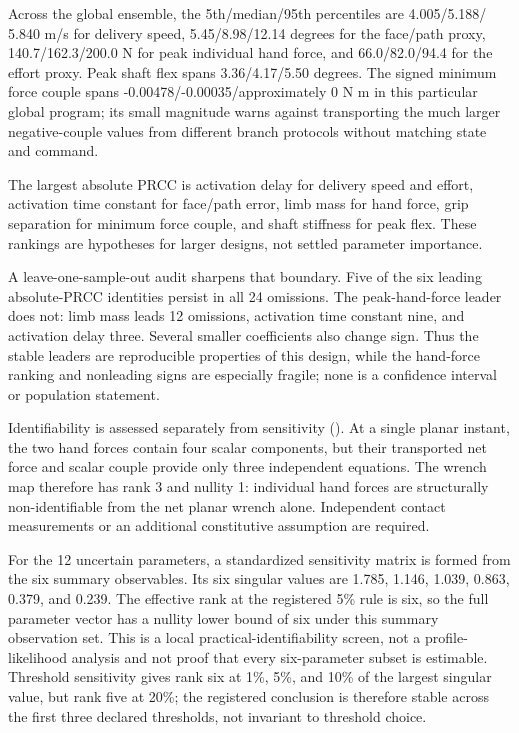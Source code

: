 \documentclass[
  letterpaper,
]{report}
\begin{document}
Across the global ensemble, the 5th/median/95th percentiles are
4.005/5.188/ 5.840 m/s for delivery speed, 5.45/8.98/12.14 degrees for
the face/path proxy, 140.7/162.3/200.0 N for peak individual hand force,
and 66.0/82.0/94.4 for the effort proxy. Peak shaft flex spans
3.36/4.17/5.50 degrees. The signed minimum force couple spans
-0.00478/-0.00035/approximately 0 N m in this particular global program;
its small magnitude warns against transporting the much larger
negative-couple values from different branch protocols without matching
state and command.

The largest absolute PRCC is activation delay for delivery speed and
effort, activation time constant for face/path error, limb mass for hand
force, grip separation for minimum force couple, and shaft stiffness for
peak flex. These rankings are hypotheses for larger designs, not settled
parameter importance.

A leave-one-sample-out audit sharpens that boundary. Five of the six
leading absolute-PRCC identities persist in all 24 omissions. The
peak-hand-force leader does not: limb mass leads 12 omissions,
activation time constant nine, and activation delay three. Several
smaller coefficients also change sign. Thus the stable leaders are
reproducible properties of this design, while the hand-force ranking and
nonleading signs are especially fragile; none is a confidence interval
or population statement.

Identifiability is assessed separately from sensitivity
(). At a single planar instant,
the two hand forces contain four scalar components, but their
transported net force and scalar couple provide only three independent
equations. The wrench map therefore has rank 3 and nullity 1: individual
hand forces are structurally non-identifiable from the net planar wrench
alone. Independent contact measurements or an additional constitutive
assumption are required.

For the 12 uncertain parameters, a standardized sensitivity matrix is
formed from the six summary observables. Its six singular values are
1.785, 1.146, 1.039, 0.863, 0.379, and 0.239. The effective rank at the
registered 5\% rule is six, so the full parameter vector has a nullity
lower bound of six under this summary observation set. This is a local
practical-identifiability screen, not a profile-likelihood analysis and
not proof that every six-parameter subset is estimable. Threshold
sensitivity gives rank six at 1\%, 5\%, and 10\% of the largest singular
value, but rank five at 20\%; the registered conclusion is therefore
stable across the first three declared thresholds, not invariant to
threshold choice.
\end{document}
